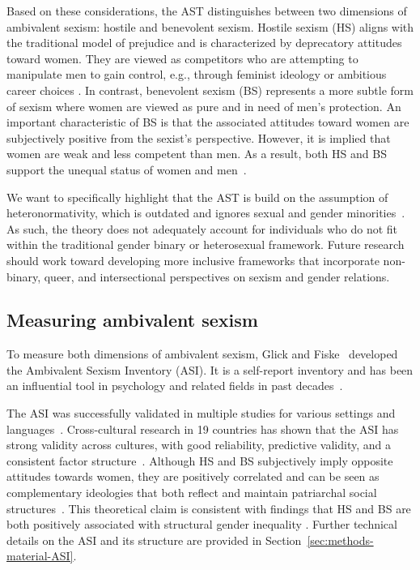 \documentclass{DESSThesis}
\begin{document}
Based on these considerations, the AST distinguishes between two dimensions of ambivalent sexism: hostile and benevolent sexism. Hostile sexism (HS) aligns with the traditional model of prejudice and is characterized by deprecatory attitudes toward women. They are viewed as competitors who are attempting to manipulate men to gain control, e.g., through feminist ideology or ambitious career choices \cite{glick_ambivalent_2001-1, glick_hostile_1997}.
In contrast, benevolent sexism (BS) represents a more subtle form of sexism where women are viewed as pure and in need of men's protection. An important characteristic of BS is that the associated attitudes toward women are subjectively positive from the sexist's perspective. However, it is implied that women are weak and less competent than men. As a result, both HS and BS support the unequal status of women and men~\cite{glick_ambivalent_2001-1}.

We want to specifically highlight that the AST is build on the assumption of heteronormativity, which is outdated and ignores sexual and gender minorities~\cite{van_der_toorn_not_2020}. As such, the theory does not adequately account for individuals who do not fit within the traditional gender binary or heterosexual framework. Future research should work toward developing more inclusive frameworks that incorporate non-binary, queer, and intersectional perspectives on sexism and gender relations.


\subsection{Measuring ambivalent sexism}
To measure both dimensions of ambivalent sexism, Glick and Fiske~\cite{glick_ambivalent_1996} developed the Ambivalent Sexism Inventory (ASI). It is a self-report inventory and has been an influential tool in psychology and related fields in past decades~\cite{bareket_systematic_2023}. 

The ASI was successfully validated in multiple studies for various settings and languages~\cite{eckes_hostilitat_1999, glick_ambivalent_1996, glick_hostile_1997, trut_initial_2022}. 
Cross-cultural research in 19 countries has shown that the ASI has strong validity across cultures, with good reliability, predictive validity, and a consistent factor structure~\cite{glick_beyond_2000}. Although HS and BS subjectively imply opposite attitudes towards women, they are positively correlated and can be seen as complementary ideologies that both reflect and maintain patriarchal social structures~\cite{glick_ambivalent_2001-1, glick_hostile_1997, glick_beyond_2000}. This theoretical claim is consistent with findings that HS and BS are both positively associated with structural gender inequality \cite{glick_beyond_2000}. Further technical details on the ASI and its structure are provided in Section~\ref{sec:methods-material-ASI}.
\end{document}
